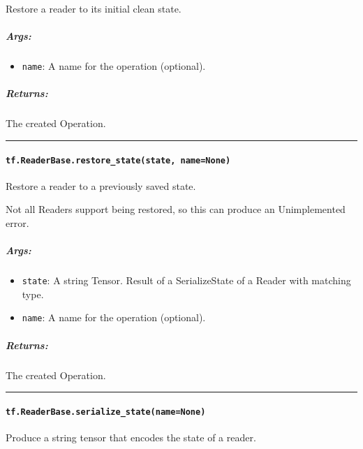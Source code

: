 Restore a reader to its initial clean state.

\subparagraph{Args: }\label{args-5}

\begin{itemize}
\tightlist
\item
  \texttt{name}: A name for the operation (optional).
\end{itemize}

\subparagraph{Returns: }\label{returns-4}

The created Operation.

\begin{center}\rule{0.5\linewidth}{\linethickness}\end{center}

\paragraph{\texorpdfstring{\texttt{tf.ReaderBase.restore\_state(state,\ name=None)}
}{tf.ReaderBase.restore\_state(state, name=None) }}\label{tf.readerbase.restoreux5fstatestate-namenone}

Restore a reader to a previously saved state.

Not all Readers support being restored, so this can produce an
Unimplemented error.

\subparagraph{Args: }\label{args-6}

\begin{itemize}
\tightlist
\item
  \texttt{state}: A string Tensor. Result of a SerializeState of a
  Reader with matching type.
\item
  \texttt{name}: A name for the operation (optional).
\end{itemize}

\subparagraph{Returns: }\label{returns-5}

The created Operation.

\begin{center}\rule{0.5\linewidth}{\linethickness}\end{center}

\paragraph{\texorpdfstring{\texttt{tf.ReaderBase.serialize\_state(name=None)}
}{tf.ReaderBase.serialize\_state(name=None) }}\label{tf.readerbase.serializeux5fstatenamenone}

Produce a string tensor that encodes the state of a reader.

